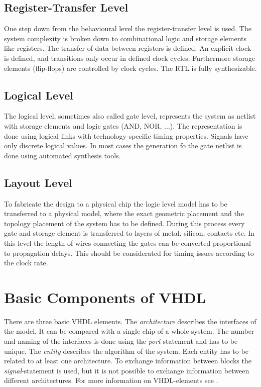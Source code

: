 \subsection{Register-Transfer Level}
One step down from the behavioural level the register-transfer level is used. The system complexity is broken down to combinational logic and storage elements like registers. The transfer of data between registers is defined. An explicit clock is defined, and transitions only occur in defined clock cycles. Furthermore storage elements (flip-flops) are controlled by clock cycles. The RTL is fully synthesizable.\cite{Ver16}\cite{Asic14}
\subsection{Logical Level}
The logical level, sometimes also called gate level, represents the system as netlist with storage elements and logic gates (AND, NOR, ...). The representation is done using logical links with technology-specific timing properties. Signals have only discrete logical values. In most cases the generation fo the gate netlist is done using automated synthesis tools.
\subsection{Layout Level}
To fabricate the design to a physical chip the logic level model has to be transferred to a physical model, where the exact geometric placement and the topology placement of the system has to be defined. During this process every gate and storage element is transferred to layers of metal, silicon, contacts etc.\cite{Cey96} In this level the length of wires connecting the gates can be converted proportional to propagation delays. This should be considerated for timing issues according to the clock rate.
\section{Basic Components of VHDL}
There are three basic VHDL elements. The \textit{architecture} describes the interfaces of the model. It can be compared with a single chip of a whole system. The number and naming of the interfaces is done using the \textit{port}-statement and has to be unique. The \textit{entity} describes the algorithm of the system. Each entity has to be related to at least one architecture. To exchange information between blocks the \textit{signal}-statement is used, but it is not possible to exchange information between different architectures. For more information on VHDL-elements see \cite{JuergenReichardt2013}.